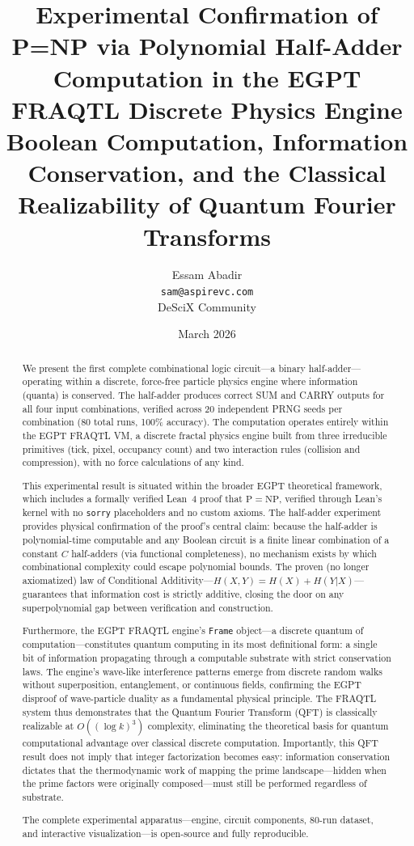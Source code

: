 \documentclass[11pt,a4paper]{article}
\title{%
    \textbf{Experimental Confirmation of P=NP via Polynomial Half-Adder Computation in the EGPT FRAQTL Discrete Physics Engine}\\[0.5em]
    \large Boolean Computation, Information Conservation, and the Classical Realizability of Quantum Fourier Transforms
}
\author{
    Essam Abadir\\
    \texttt{sam@aspirevc.com}\\[0.5em]
    \small DeSciX Community
}
\date{March 2026}
\begin{document}
\maketitle

\begin{abstract}
We present the first complete combinational logic circuit---a binary half-adder---operating within a discrete, force-free particle physics engine where information (quanta) is conserved. The half-adder produces correct SUM and CARRY outputs for all four input combinations, verified across 20 independent PRNG seeds per combination (80 total runs, 100\% accuracy). The computation operates entirely within the EGPT FRAQTL VM, a discrete fractal physics engine built from three irreducible primitives (tick, pixel, occupancy count) and two interaction rules (collision and compression), with no force calculations of any kind.

This experimental result is situated within the broader EGPT theoretical framework, which includes a formally verified Lean~4 proof that $\mathrm{P} = \mathrm{NP}$, verified through Lean's kernel with no \texttt{sorry} placeholders and no custom axioms. The half-adder experiment provides physical confirmation of the proof's central claim: because the half-adder is polynomial-time computable and any Boolean circuit is a finite linear combination of a constant $C$ half-adders (via functional completeness), no mechanism exists by which combinational complexity could escape polynomial bounds. The proven (no longer axiomatized) law of Conditional Additivity---$H(X,Y) = H(X) + H(Y|X)$---guarantees that information cost is strictly additive, closing the door on any superpolynomial gap between verification and construction.

Furthermore, the EGPT FRAQTL engine's \texttt{Frame} object---a discrete quantum of computation---constitutes quantum computing in its most definitional form: a single bit of information propagating through a computable substrate with strict conservation laws. The engine's wave-like interference patterns emerge from discrete random walks without superposition, entanglement, or continuous fields, confirming the EGPT disproof of wave-particle duality as a fundamental physical principle. The FRAQTL system thus demonstrates that the Quantum Fourier Transform (QFT) is classically realizable at $O((\log k)^3)$ complexity, eliminating the theoretical basis for quantum computational advantage over classical discrete computation. Importantly, this QFT result does not imply that integer factorization becomes easy: information conservation dictates that the thermodynamic work of mapping the prime landscape---hidden when the prime factors were originally composed---must still be performed regardless of substrate.

The complete experimental apparatus---engine, circuit components, 80-run dataset, and interactive visualization---is open-source and fully reproducible.
\end{abstract}
\end{document}
